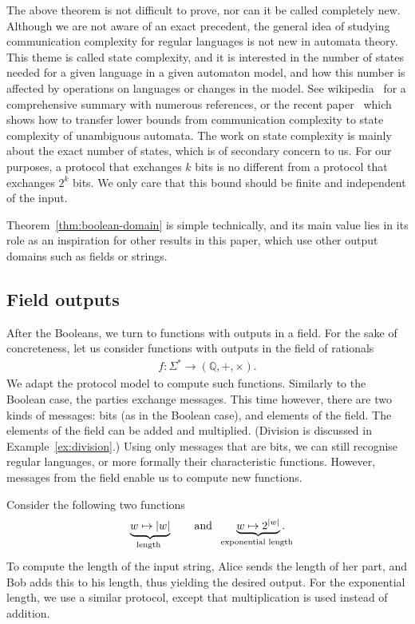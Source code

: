 The above theorem is not difficult to prove, nor can it be called completely new.  Although we are not aware of an exact precedent, the general idea of studying communication complexity for regular languages is not new in automata theory. This theme is called state complexity, and it is interested  in the number of states needed for a given language in a given automaton model, and how this number is affected by operations on languages or changes in the model. See  wikipedia~\cite{stateComplexityWiki} for a comprehensive summary with numerous references, or the recent paper~\cite{goosKiefer2022} which shows how to transfer lower bounds from communication complexity to state complexity of unambiguous automata. The work on state complexity is mainly about the exact number of states, which is of secondary concern to us. For our purposes, a protocol that exchanges $k$ bits is no different from a protocol that exchanges $2^k$ bits. We only care that this bound should be finite and independent of the input. 

Theorem~\ref{thm:boolean-domain} is  simple  technically, and its main value lies in its role as an inspiration for other results in this paper, which use  other output domains  such as  fields or strings. 


\subsection{Field outputs}
\label{sec:intro-field}



After the Booleans, we turn to functions with outputs in a field. For the sake of concreteness, let us  consider functions with outputs in the  field of rationals
\begin{align*}
f : \Sigma^* \to (\mathbb Q, +, \times).
\end{align*}
We adapt the  protocol model to  compute such functions. Similarly to the Boolean case, the parties exchange messages. This time however, there are two kinds of messages: bits (as in the Boolean case), and  elements of the field.  The elements of the field can be added and multiplied.  (Division is discussed in Example~\ref{ex:division}.)  Using only messages that are bits, we can still recognise regular languages, or more formally their characteristic functions. 
However, messages from the field enable us to compute new functions.

\begin{myexample}\label{ex:length}
    Consider the following two functions
\begin{align*}
\myunderbrace{w \mapsto |w|}{length} \qquad \text{and} \qquad \myunderbrace{w \mapsto 2^{|w|}}{exponential length}.
\end{align*}
To compute the length of the input string, Alice  sends the length of her part, and Bob adds this to his length, thus yielding the desired output. For the exponential length, we use a similar protocol, except that multiplication is used instead of addition. 
\end{myexample}


